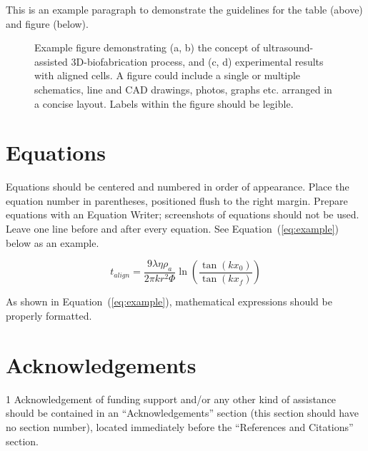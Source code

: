 \documentclass[10pt]{article}
\def\blind{1}
\begin{document}
This is an example paragraph to demonstrate the guidelines for the table (above) and figure (below).

\begin{figure}[h!]
\centering
\caption{Example figure demonstrating (a, b) the concept of ultrasound-assisted 3D-biofabrication process, and (c, d) experimental results with aligned cells. A figure could include a single or multiple schematics, line and CAD drawings, photos, graphs etc. arranged in a concise layout. Labels within the figure should be legible.}
\label{fig:example}
\end{figure}

\section{Equations}

Equations should be centered and numbered in order of appearance. Place the equation number in parentheses, positioned flush to the right margin. Prepare equations with an Equation Writer; screenshots of equations should not be used. Leave one line before and after every equation. See Equation~(\ref{eq:example}) below as an example.

\begin{equation}
t_{align} = \frac{9\lambda\eta\rho_a}{2\pi kr^2 \Phi} \ln\left(\frac{\tan(kx_0)}{\tan(kx_f)}\right)
\label{eq:example}
\end{equation}

As shown in Equation~(\ref{eq:example}), mathematical expressions should be properly formatted.


\section*{Acknowledgements}

\blind
Acknowledgement of funding support and/or any other kind of assistance should be contained in an ``Acknowledgements'' section (this section should have no section number), located immediately before the ``References and Citations'' section.
\fi
\end{document}
